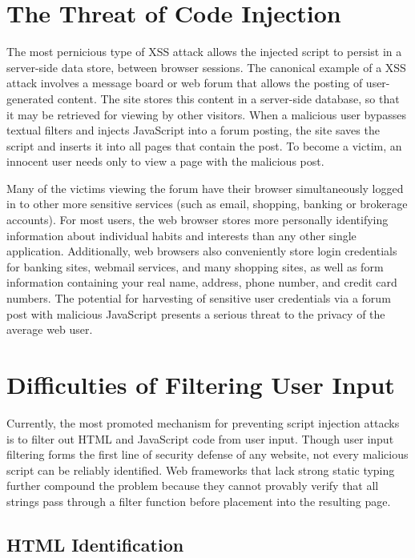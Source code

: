 \section{The Threat of Code Injection}

The most pernicious type of XSS attack allows the injected script to persist in a server-side data store, between browser sessions.
The canonical example of a  XSS attack involves a message board or web forum that allows the posting of user-generated content.
The site stores this content in a server-side database, so that it may be retrieved for viewing by other visitors.
When a malicious user bypasses textual filters and injects JavaScript into a forum posting, the site saves the script and inserts it into all pages that contain the post.
To become a victim, an innocent user needs only to view a page with the malicious post.

Many of the victims viewing the forum have their browser simultaneously logged in to other more sensitive services (such as email, shopping, banking or brokerage accounts).
For most users, the web browser stores more personally identifying information about individual habits and interests than any other single application.
Additionally, web browsers also conveniently store login credentials for banking sites, webmail services, and many shopping sites, as well as form information containing your real name, address, phone number, and credit card numbers.
The potential for harvesting of sensitive user credentials via a forum post with malicious JavaScript presents a serious threat to the privacy of the average web user.

\section{Difficulties of Filtering User Input}

Currently, the most promoted mechanism for preventing script injection attacks is to filter out HTML and JavaScript code from user input.
Though user input filtering forms the first line of security defense of any website, not every malicious script can be reliably identified.
Web frameworks that lack strong static typing further compound the problem because they cannot provably verify that all strings pass through a filter function before placement into the resulting page.

\subsection{HTML Identification}
\label{subsec:html-encoding}

